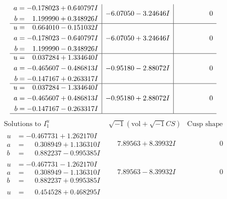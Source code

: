 \documentclass[1p]{elsarticle_modified}
\theoremstyle{definition}
\newcommand{\I}{\sqrt{-1}}
\begin{document}
$$\begin{array}{c|c|c}
\begin{aligned}
a &= -0.178023 + 0.640797 I \\
b &= \phantom{-}1.199990 + 0.348926 I\end{aligned}
 & -6.07050 - 3.24646 I & \phantom{-0.000000 } 0 \\ \hline\begin{aligned}
u &= \phantom{-}0.664010 - 0.151032 I \\
a &= -0.178023 - 0.640797 I \\
b &= \phantom{-}1.199990 - 0.348926 I\end{aligned}
 & -6.07050 + 3.24646 I & \phantom{-0.000000 } 0 \\ \hline\begin{aligned}
u &= \phantom{-}0.037284 + 1.334640 I \\
a &= -0.465607 - 0.486813 I \\
b &= -0.147167 + 0.263317 I\end{aligned}
 & -0.95180 - 2.88072 I & \phantom{-0.000000 } 0 \\ \hline\begin{aligned}
u &= \phantom{-}0.037284 - 1.334640 I \\
a &= -0.465607 + 0.486813 I \\
b &= -0.147167 - 0.263317 I\end{aligned}
 & -0.95180 + 2.88072 I & \phantom{-0.000000 } 0\\
 \hline 
 \end{array}$$\newpage$$\begin{array}{c|c|c}  
\text{Solutions to }I^u_{1}& \I (\text{vol} + \sqrt{-1}CS) & \text{Cusp shape}\\
 \hline 
\begin{aligned}
u &= -0.467731 + 1.262170 I \\
a &= \phantom{-}0.308949 + 1.136310 I \\
b &= \phantom{-}0.882237 - 0.995385 I\end{aligned}
 & \phantom{-}7.89563 + 8.39932 I & \phantom{-0.000000 } 0 \\ \hline\begin{aligned}
u &= -0.467731 - 1.262170 I \\
a &= \phantom{-}0.308949 - 1.136310 I \\
b &= \phantom{-}0.882237 + 0.995385 I\end{aligned}
 & \phantom{-}7.89563 - 8.39932 I & \phantom{-0.000000 } 0 \\ \hline\begin{aligned}
u &= \phantom{-}0.454528 + 0.468295 I \\

\end{aligned}
\end{array}$$
\end{document}
